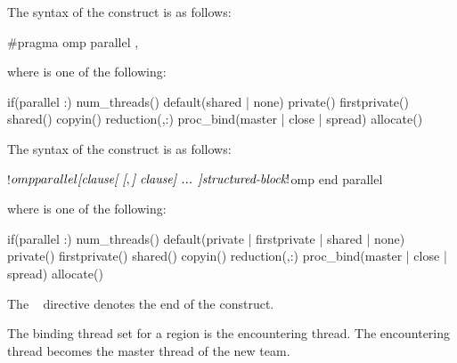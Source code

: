 \syntax
\begin{ccppspecific}
The syntax of the  construct is as follows:
\begin{ompcPragma}
#pragma omp parallel \plc{[clause[ [},\plc{] clause] ... ] new-line}
\end{ompcPragma}

where  is one of the following:

{}
\begin{indentedcodelist}
if(\plc{[}parallel :\plc{] scalar-expression})
num_threads()
default(shared \textnormal{|} none)
private()
firstprivate()
shared()
copyin()
reduction(\plc{[ reduction-modifier},\plc{]reduction-identifier }:)
proc_bind(master \textnormal{|} close \textnormal{|} spread)
allocate(\plc{[allocator: ]})
\end{indentedcodelist}
\end{ccppspecific}

\begin{fortranspecific}
The syntax of the  construct is as follows:

\begin{ompfPragma}
!$omp parallel \plc{[clause[ [},\plc{] clause] ... ]}
   \plc{structured-block}
!$omp end parallel
\end{ompfPragma}

\begin{samepage}
where  is one of the following:

{}
\begin{indentedcodelist}
if(\plc{[}parallel :\plc{] scalar-logical-expression})
num_threads()
default(private \textnormal{|} firstprivate \textnormal{|} shared \textnormal{|} none)
private()
firstprivate()
shared()
copyin()
reduction(\plc{[ reduction-modifier},\plc{]reduction-identifier }:)
proc_bind(master \textnormal{|} close \textnormal{|} spread)
allocate(\plc{[allocator: ]})
\end{indentedcodelist}
\end{samepage}

The ~ directive denotes the end of the  construct.
\end{fortranspecific}

\binding
The binding thread set for a  region is the encountering thread. The
encountering thread becomes the master thread of the new team.

